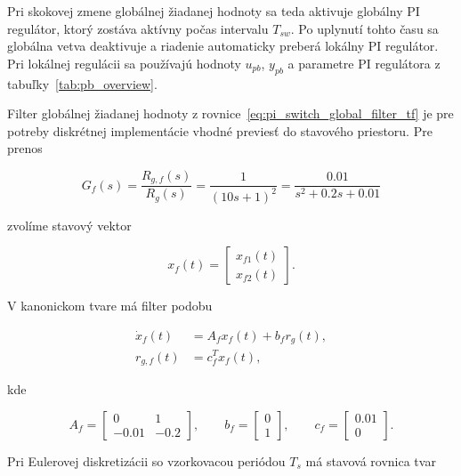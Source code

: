 Pri skokovej zmene globálnej žiadanej hodnoty
sa teda aktivuje globálny PI regulátor,
ktorý zostáva aktívny počas intervalu $T_{sw}$.
Po uplynutí tohto času sa globálna vetva deaktivuje
a riadenie automaticky preberá lokálny PI regulátor.
Pri lokálnej regulácii sa používajú hodnoty
$u_{pb}$, $y_{pb}$ a parametre PI regulátora
z tabuľky~\ref{tab:pb_overview}.

Filter globálnej žiadanej hodnoty
z rovnice~\eqref{eq:pi_switch_global_filter_tf}
je pre potreby diskrétnej implementácie
vhodné previesť do stavového priestoru.
Pre prenos

\begin{equation}
G_f(s)=\frac{R_{g,f}(s)}{R_g(s)}
=
\frac{1}{(10s+1)^2}
=
\frac{0.01}{s^2 + 0.2s + 0.01}
\label{eq:pi_switch_filter_tf_repeat}
\end{equation}

zvolíme stavový vektor

\begin{equation}
x_f(t)=
\begin{bmatrix}
x_{f1}(t)\\
x_{f2}(t)
\end{bmatrix}.
\label{eq:pi_switch_filter_state_vector}
\end{equation}

V kanonickom tvare má filter podobu

\begin{align}
\dot{x}_f(t) &= A_f x_f(t) + b_f r_g(t),
\label{eq:pi_switch_filter_state_model}
\\
r_{g,f}(t) &= c_f^T x_f(t),
\label{eq:pi_switch_filter_output_model}
\end{align}

kde

\begin{equation}
A_f =
\begin{bmatrix}
0 & 1\\
-0.01 & -0.2
\end{bmatrix},
\qquad
b_f =
\begin{bmatrix}
0\\
1
\end{bmatrix},
\qquad
c_f =
\begin{bmatrix}
0.01\\
0
\end{bmatrix}.
\label{eq:pi_switch_filter_matrices}
\end{equation}

Pri Eulerovej diskretizácii so vzorkovacou periódou $T_s$
má stavová rovnica tvar

